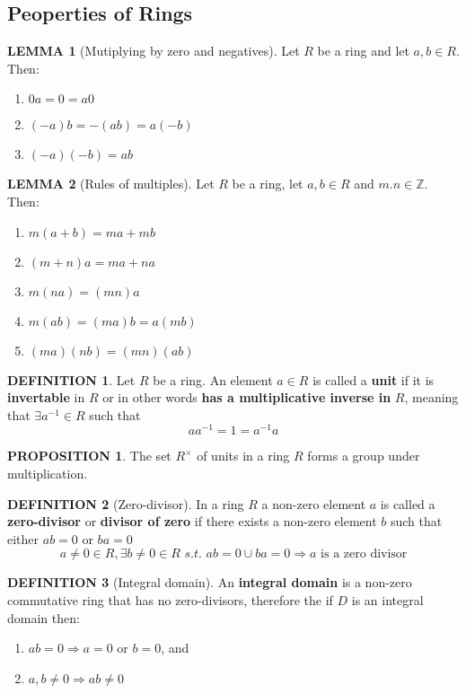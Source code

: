\documentclass[12pt]{article}
\theoremstyle{definition}
\newtheorem{definition}{DEFINITION}[subsection]
\newcommand{\suchthat}{\textit{ s.t. }}
\newtheorem{lemma}{LEMMA}[subsection]
\newtheorem{prop}{PROPOSITION}[subsection]
\begin{document}
\subsection{Peoperties of Rings}
\begin{lemma}[Mutiplying by zero and negatives]
    Let $R$ be a ring and let $a,b \in R$. Then:
    \begin{enumerate}
        \item $0a = 0 = a0$
        \item $(-a)b = -(ab) = a(-b)$
        \item $(-a)(-b) = ab$
    \end{enumerate}
\end{lemma}

\begin{lemma}[Rules of multiples]
    Let $R$ be a ring, let $a,b\in R$ and $m.n \in \mathbb{Z}$. Then:
    \begin{enumerate}
        \item $m(a+b) = ma + mb$
        \item $(m+n)a = ma + na$
        \item $m(na) = (mn)a$
        \item $m(ab) = (ma)b = a(mb)$
        \item $(ma)(nb) = (mn)(ab)$
    \end{enumerate}
\end{lemma}

\begin{definition}
    Let $R$ be a ring. An element $a \in R$ is called a \textbf{unit} if it is \textbf{invertable} in $R$ or in other words \textbf{has a multiplicative inverse in} $R$, meaning that $\exists a^{-1} \in R$ such that $$aa^{-1} = 1 = a^{-1}a$$
\end{definition}

\begin{prop}
    The set $R^{\times}$ of units in a ring $R$ forms a group under multiplication.
\end{prop}

\begin{definition}[Zero-divisor]
    In a ring $R$ a non-zero element $a$ is called a \textbf{zero-divisor} or \textbf{divisor of zero} if there exists a non-zero element $b$ such that either $ab = 0$ or $ba = 0$
    $${a \neq 0 \in R, \exists b \neq 0 \in R \suchthat ab = 0 \cup ba = 0} \Rightarrow {a\text{ is a zero divisor}}$$
\end{definition}

\begin{definition}[Integral domain]
    An \textbf{integral domain} is a non-zero commutative ring that has no zero-divisors, therefore the if $D$ is an integral domain then:
    \begin{enumerate}
        \item $ab = 0 \Rightarrow  a = 0$ or $b = 0$, and
        \item $a,b\neq 0 \Rightarrow ab \neq 0$
    \end{enumerate}
\end{definition}
\end{document}
